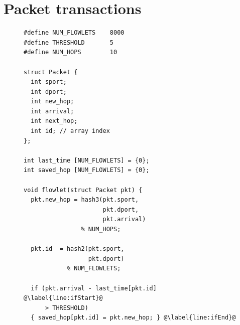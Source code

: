 
\section{Packet transactions}
\label{s:transactions}

\begin{figure}[!t]
\begin{minipage}{0.5\textwidth}
\begin{small}
\begin{lstlisting}[style=customc]
#define NUM_FLOWLETS    8000
#define THRESHOLD       5
#define NUM_HOPS        10

struct Packet {
  int sport;
  int dport;
  int new_hop;
  int arrival;
  int next_hop;
  int id; // array index
};

int last_time [NUM_FLOWLETS] = {0};
int saved_hop [NUM_FLOWLETS] = {0};

void flowlet(struct Packet pkt) {
  pkt.new_hop = hash3(pkt.sport,
                      pkt.dport,
                      pkt.arrival)
                % NUM_HOPS;

  pkt.id  = hash2(pkt.sport,
                  pkt.dport)
            % NUM_FLOWLETS;

  if (pkt.arrival - last_time[pkt.id] @\label{line:ifStart}@
      > THRESHOLD)
  { saved_hop[pkt.id] = pkt.new_hop; } @\label{line:ifEnd}@


\end{lstlisting}
\end{small}
\end{minipage}
\end{figure}
